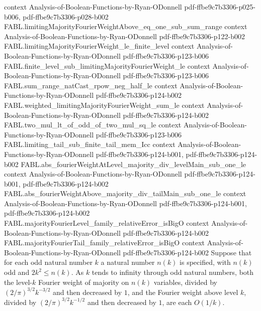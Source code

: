 \begin{theorem}
  {context}
  {Analysis-of-Boolean-Functions-by-Ryan-ODonnell}
  {pdf-ffbe9c7b3306-p025-b006,
    pdf-ffbe9c7b3306-p028-b002}
\proofstep
  {FABL.limitingMajorityFourierWeightAbove_eq_one_sub_sum_range}
  {context}
  {Analysis-of-Boolean-Functions-by-Ryan-ODonnell}
  {pdf-ffbe9c7b3306-p122-b002}
\proofstep
  {FABL.limitingMajorityFourierWeight_le_finite_level}
  {context}
  {Analysis-of-Boolean-Functions-by-Ryan-ODonnell}
  {pdf-ffbe9c7b3306-p123-b006}
\proofstep
  {FABL.finite_level_sub_limitingMajorityFourierWeight_le}
  {context}
  {Analysis-of-Boolean-Functions-by-Ryan-ODonnell}
  {pdf-ffbe9c7b3306-p123-b006}
\proofstep
  {FABL.sum_range_natCast_rpow_neg_half_le}
  {context}
  {Analysis-of-Boolean-Functions-by-Ryan-ODonnell}
  {pdf-ffbe9c7b3306-p124-b002}
\proofstep
  {FABL.weighted_limitingMajorityFourierWeight_sum_le}
  {context}
  {Analysis-of-Boolean-Functions-by-Ryan-ODonnell}
  {pdf-ffbe9c7b3306-p124-b002}
\proofstep
  {FABL.two_mul_lt_of_odd_of_two_mul_sq_le}
  {context}
  {Analysis-of-Boolean-Functions-by-Ryan-ODonnell}
  {pdf-ffbe9c7b3306-p123-b006}
\proofstep
  {FABL.limiting_tail_sub_finite_tail_mem_Icc}
  {context}
  {Analysis-of-Boolean-Functions-by-Ryan-ODonnell}
  {pdf-ffbe9c7b3306-p124-b001,
    pdf-ffbe9c7b3306-p124-b002}
\proofstep
  {FABL.abs_fourierWeightAtLevel_majority_div_levelMain_sub_one_le}
  {context}
  {Analysis-of-Boolean-Functions-by-Ryan-ODonnell}
  {pdf-ffbe9c7b3306-p124-b001,
    pdf-ffbe9c7b3306-p124-b002}
\proofstep
  {FABL.abs_fourierWeightAbove_majority_div_tailMain_sub_one_le}
  {context}
  {Analysis-of-Boolean-Functions-by-Ryan-ODonnell}
  {pdf-ffbe9c7b3306-p124-b001,
    pdf-ffbe9c7b3306-p124-b002}
\proofstep
  {FABL.majorityFourierLevel_family_relativeError_isBigO}
  {context}
  {Analysis-of-Boolean-Functions-by-Ryan-ODonnell}
  {pdf-ffbe9c7b3306-p124-b002}
\proofstep
  {FABL.majorityFourierTail_family_relativeError_isBigO}
  {context}
  {Analysis-of-Boolean-Functions-by-Ryan-ODonnell}
  {pdf-ffbe9c7b3306-p124-b002}
Suppose that for each odd natural number $k$ a natural number $n(k)$ is specified, with
$n(k)$ odd and $2k^2\le n(k)$. As $k$ tends to infinity through odd natural numbers,
both the level-$k$ Fourier weight of majority on $n(k)$ variables, divided by
$(2/\pi)^{3/2}k^{-3/2}$ and then decreased by $1$, and the Fourier weight above level
$k$, divided by $(2/\pi)^{3/2}k^{-1/2}$ and then decreased by $1$, are each $O(1/k)$.
\end{theorem}
